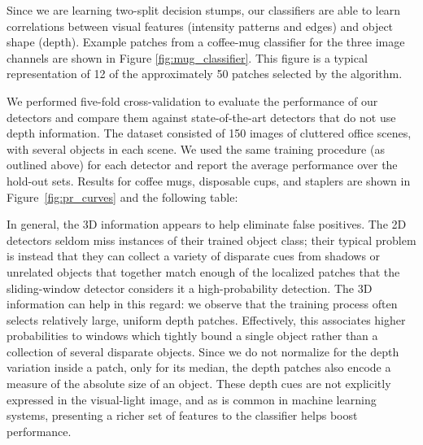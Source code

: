 \documentclass[letterpaper, 10 pt, conference]{ieeeconf}  %
\begin{document}
Since we are learning two-split decision stumps, our classifiers are able to
learn correlations between visual features (intensity patterns and edges) and
object shape (depth). Example patches from a coffee-mug classifier for the
three image channels are shown in Figure \ref{fig:mug_classifier}. This figure
is a typical representation of 12 of the approximately 50 patches selected by
the algorithm.

We performed five-fold cross-validation to evaluate the performance of our
detectors and compare them against state-of-the-art detectors that do not use
depth information. The dataset consisted of 150 images of cluttered office
scenes, with several objects in each scene. We used the same training
procedure (as outlined above) for each detector and report the average
performance over the hold-out sets. Results for coffee mugs, disposable cups,
and staplers are shown in Figure~\ref{fig:pr_curves} and the following
table:%
  
\begin{center}  \end{center}

In general, the 3D information appears to help eliminate false positives. The
2D detectors seldom miss instances of their trained object class; their typical
problem is instead that they can collect a variety of disparate cues from
shadows or unrelated objects that together match enough of the localized
patches that the sliding-window detector considers it a high-probability
detection. The 3D information can help in this regard: we observe that the
training process often selects relatively large, uniform depth patches.
Effectively, this associates higher probabilities to windows which tightly
bound a single object rather than a collection of several disparate objects.
Since we do not normalize for the depth variation inside a patch, only for its
median, the depth patches also encode a measure of the absolute size of an
object.  These depth cues are not explicitly expressed in the visual-light
image, and as is common in machine learning systems, presenting a richer set of
features to the classifier helps boost performance.
\end{document}
